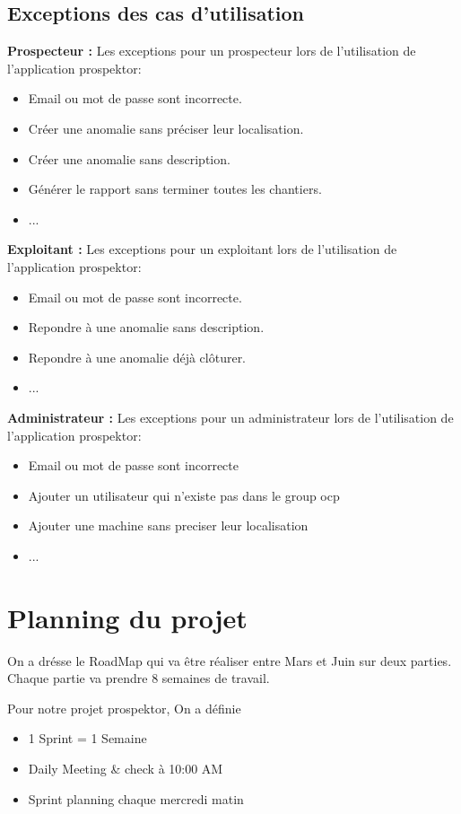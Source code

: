 \subsection{Exceptions des cas d'utilisation}

\textbf{Prospecteur :} Les exceptions pour un prospecteur lors de l'utilisation de l'application prospektor:
\begin{itemize}
\item Email ou mot de passe sont incorrecte.
\item Cr\'eer une anomalie sans pr\'eciser leur localisation.
\item Cr\'eer une anomalie sans description.
\item G\'en\'erer le rapport sans terminer toutes les chantiers.
\item ...
\end{itemize}
\textbf{Exploitant :} Les exceptions pour un exploitant lors de l'utilisation de l'application prospektor:
\begin{itemize}
\item Email ou mot de passe sont incorrecte.
\item Repondre \`a une anomalie sans description.
\item Repondre \`a une anomalie d\'ej\`a cl\^oturer.
\item ...
\end{itemize}
\textbf{Administrateur :} Les exceptions pour un administrateur lors de l'utilisation de l'application prospektor:
\begin{itemize}
\item Email ou mot de passe sont incorrecte
\item Ajouter un utilisateur qui n'existe pas dans le group ocp
\item Ajouter une machine sans preciser leur localisation
\item ...
\end{itemize}

\section{Planning du projet}
On a dr\'esse le RoadMap qui va \^etre r\'ealiser entre Mars et Juin sur deux parties. Chaque partie va prendre 8 semaines de travail.

Pour notre projet prospektor, On a d\'efinie 
\begin{itemize}
\item 1 Sprint = 1 Semaine
\item Daily Meeting \& check \`a 10:00 AM
\item Sprint planning chaque mercredi matin
\end{itemize}

